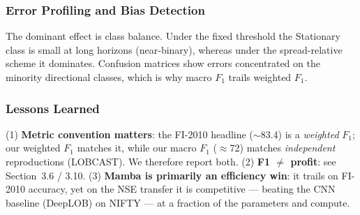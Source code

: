 \documentclass[11pt]{article}
\begin{document}
\subsubsection{Error Profiling and Bias Detection}
The dominant effect is class balance. Under the fixed threshold the Stationary class is small at long
horizons (near-binary), whereas under the spread-relative scheme it dominates. Confusion matrices show
errors concentrated on the minority directional classes, which is why macro $F_1$ trails weighted $F_1$.

\subsubsection{Lessons Learned}
(1) \textbf{Metric convention matters}: the FI-2010 headline ($\sim$83.4) is a \emph{weighted} $F_1$; our
weighted $F_1$ matches it, while our macro $F_1$ ($\approx$72) matches \emph{independent} reproductions
(LOBCAST). We therefore report both. (2) \textbf{F1 $\ne$ profit}: see Section~3.6 / 3.10. (3)
\textbf{Mamba is primarily an efficiency win}: it trails on FI-2010 accuracy, yet on the NSE transfer it is
competitive --- beating the CNN baseline (DeepLOB) on NIFTY --- at a fraction of the parameters and compute.
\end{document}
